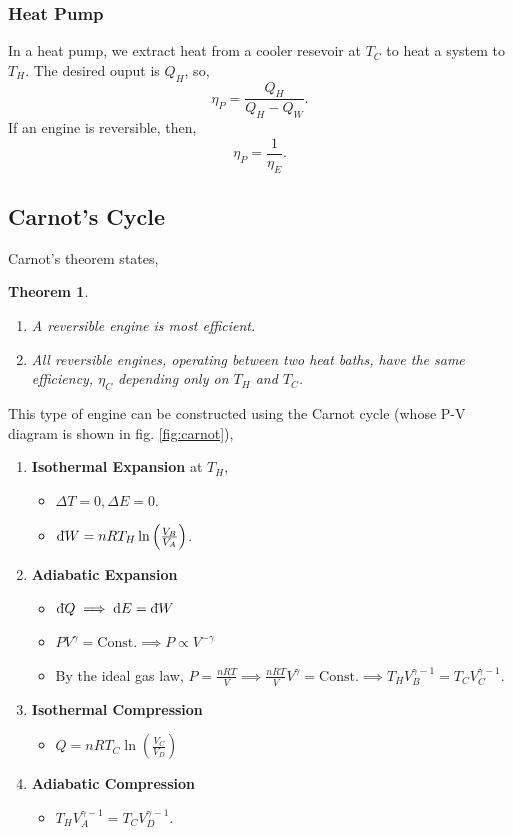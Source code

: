 \documentclass{book}
\newtheorem*{theorem}{Theorem}
\newcommand{\dbar}{\mathrm{d}\hspace*{-0.08em}\bar{}\hspace*{0.1em}}
\begin{document}
\subsubsection{Heat Pump}
In a heat pump, we extract heat from a cooler resevoir at $T_C$ to heat a system to $T_H$. The desired ouput is $Q_H$, so,
\begin{equation}
	\eta_P = \frac{Q_H}{Q_H - Q_W}.
\end{equation}
If an engine is reversible, then,
\begin{equation}
	\eta_P = \frac{1}{\eta_E}.
\end{equation}
\subsection{Carnot's Cycle}

Carnot's theorem states,
\begin{theorem}
	\hspace{5px}
	\begin{enumerate}
		\item A reversible engine is most efficient.
		\item All reversible engines, operating between two heat baths, have the same efficiency, $\eta_C$ depending only on $T_H$ and $T_C$.
	\end{enumerate}
\end{theorem}\noindent
This type of engine can be constructed using the Carnot cycle (whose P-V diagram is shown in fig. \ref{fig:carnot}),
\begin{enumerate}
	\item \textbf{Isothermal Expansion} at $T_H$,
	\begin{itemize}
		\item $\Delta T = 0, \Delta E = 0$.
		\item $\dbar W = nRT_H\ln\left(\frac{V_B}{V_A}\right)$.
	\end{itemize}
	\item \textbf{Adiabatic Expansion}
	\begin{itemize}
		\item $\dbar Q \implies \dd{E} = \dbar W$
		\item $PV^{\gamma} = \text{Const.} \implies P \propto V^{-\gamma}$
		\item By the ideal gas law, $P = \frac{nRT}{V} \implies \frac{nRT}{V}V^{\gamma} = \text{Const.} \implies T_H V_B^{\gamma - 1} = T_CV_C^{\gamma -1}$.
	\end{itemize}
	\item \textbf{Isothermal Compression}
	\begin{itemize}
		\item $Q = nRT_C\ln\left(\frac{V_C}{V_D}\right)$
	\end{itemize}
	\item \textbf{Adiabatic Compression}
	\begin{itemize}
		\item $T_H V_A^{\gamma -1} = T_CV_D^{\gamma -1}$.
	\end{itemize}
\end{enumerate}
\end{document}
